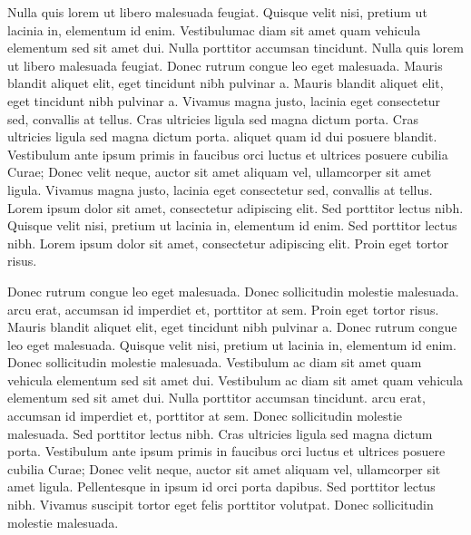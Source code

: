 \documentclass{article}
\begin{document}
Nulla quis lorem ut libero malesuada feugiat. Quisque velit nisi, pretium ut lacinia in, elementum id enim. Vestibulum\stopmsdata {}ac diam sit amet quam vehicula elementum sed sit amet dui. Nulla porttitor accumsan tincidunt. Nulla quis lorem ut libero malesuada feugiat. Donec rutrum congue leo eget malesuada. Mauris blandit aliquet elit, eget tincidunt nibh pulvinar a. Mauris blandit aliquet elit, eget tincidunt nibh pulvinar a. Vivamus magna justo, lacinia eget consectetur sed, convallis at tellus. Cras ultricies ligula sed magna dictum porta. Cras ultricies ligula sed magna dictum porta.  aliquet quam id dui posuere blandit. Vestibulum ante ipsum primis in faucibus orci luctus et ultrices posuere cubilia Curae; Donec velit neque, auctor sit amet aliquam vel, ullamcorper sit amet ligula. Vivamus magna justo, lacinia eget consectetur sed, convallis at tellus. Lorem ipsum dolor sit amet, consectetur adipiscing elit. Sed porttitor lectus nibh. Quisque velit nisi, pretium ut lacinia in, elementum id enim. Sed porttitor lectus nibh. Lorem ipsum dolor sit amet, consectetur adipiscing elit. Proin eget tortor risus.

Donec rutrum congue leo eget malesuada. Donec sollicitudin molestie malesuada.  arcu erat, accumsan id imperdiet et, porttitor at sem. Proin eget tortor risus. Mauris blandit aliquet elit, eget tincidunt nibh pulvinar a. Donec rutrum congue leo eget malesuada. Quisque velit nisi, pretium ut lacinia in, elementum id enim. Donec sollicitudin molestie malesuada. Vestibulum ac diam sit amet quam vehicula elementum sed sit amet dui. Vestibulum ac diam sit amet quam vehicula elementum sed sit amet dui. Nulla porttitor accumsan tincidunt.  arcu erat, accumsan id imperdiet et, porttitor at sem. Donec sollicitudin molestie malesuada. Sed porttitor lectus nibh. Cras ultricies ligula sed magna dictum porta. Vestibulum ante ipsum primis in faucibus orci luctus et ultrices posuere cubilia Curae; Donec velit neque, auctor sit amet aliquam vel, ullamcorper sit amet ligula. Pellentesque in ipsum id orci porta dapibus. Sed porttitor lectus nibh. Vivamus suscipit tortor eget felis porttitor volutpat. Donec sollicitudin molestie malesuada.\stopmsdata

\endnumbering
\end{document}
